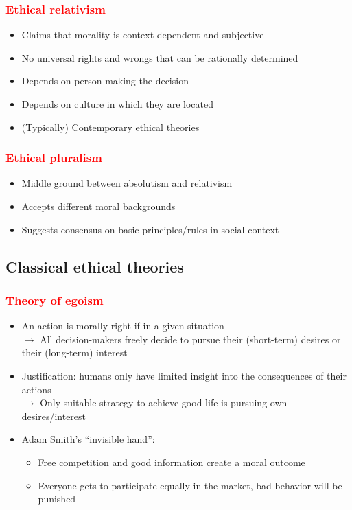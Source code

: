 \documentclass{article}
\DeclareRobustCommand{\k}[1]{\textcolor{red}{#1}}
\begin{document}
\subsubsection{\k{Ethical relativism}}
\begin{itemize}
    \item Claims that morality is context-dependent and subjective
    \item No universal rights and wrongs that can be rationally determined
    \item Depends on person making the decision
    \item Depends on culture in which they are located
    \item (Typically) Contemporary ethical theories
\end{itemize}

\subsubsection{\k{Ethical pluralism}}
\begin{itemize}
    \item Middle ground between absolutism and relativism
    \item Accepts different moral backgrounds
    \item Suggests consensus on basic principles/rules in social context
\end{itemize}

\subsection{Classical ethical theories}
\subsubsection{\k{Theory of egoism}}
\begin{itemize}
    \item An action is morally right if in a given situation\\
    $\to$ All decision-makers freely decide to pursue their (short-term) desires or their (long-term) interest
    \item Justification: humans only have limited insight into the consequences of their actions\\
    $\to$ Only suitable strategy to achieve good life is pursuing own desires/interest
    \item Adam Smith's ``invisible hand'':
    \begin{itemize}[label=$\to$]
        \item Free competition and good information create a moral outcome
        \item Everyone gets to participate equally in the market, bad behavior will be punished
    \end{itemize}
\end{itemize}
\end{document}
